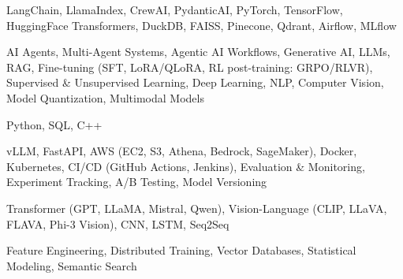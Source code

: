 \documentclass[letter,10pt]{article}
\begin{document}
 LangChain, LlamaIndex, CrewAI, PydanticAI, PyTorch, TensorFlow, HuggingFace Transformers, DuckDB, FAISS, Pinecone, Qdrant, Airflow, MLflow\par\vspace{2pt}

 AI Agents, Multi-Agent Systems, Agentic AI Workflows, Generative AI, LLMs, RAG, Fine-tuning (SFT, LoRA/QLoRA, RL post-training: GRPO/RLVR), Supervised \& Unsupervised Learning, Deep Learning, NLP, Computer Vision, Model Quantization, Multimodal Models\par\vspace{2pt}

 Python, SQL, C++\par\vspace{2pt}

 vLLM, FastAPI, AWS (EC2, S3, Athena, Bedrock, SageMaker), Docker, Kubernetes, CI/CD (GitHub Actions, Jenkins), Evaluation \& Monitoring, Experiment Tracking, A/B Testing, Model Versioning\par\vspace{2pt}

 Transformer (GPT, LLaMA, Mistral, Qwen), Vision-Language (CLIP, LLaVA, FLAVA, Phi-3 Vision), CNN, LSTM, Seq2Seq\par\vspace{2pt}

 Feature Engineering, Distributed Training, Vector Databases, Statistical Modeling, Semantic Search
\end{document}
